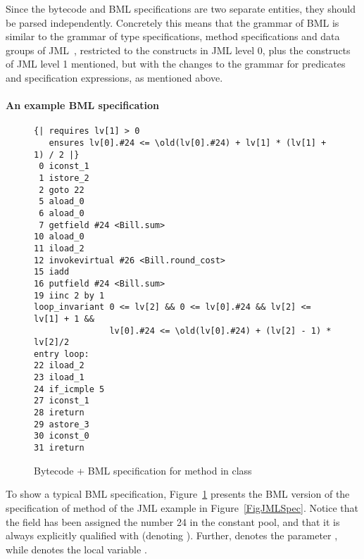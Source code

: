 Since the bytecode and BML specifications are two separate entities,
they should be parsed independently. Concretely this means that the
grammar of BML is similar to the grammar of type specifications,
method specifications and data groups of JML~\cite[\S A.5, A.6,
A.7]{JMLReferenceManual05}, restricted to the constructs in JML level
0, plus the constructs of JML level 1 mentioned, but with the changes
to the grammar for predicates and specification expressions, as
mentioned above. 




\paragraph{An example BML specification}
\label{sec:bml:example}


\begin{figure}[t]
{\small
\begin{verbatim}
{| requires lv[1] > 0 
   ensures lv[0].#24 <= \old(lv[0].#24) + lv[1] * (lv[1] + 1) / 2 |}
 0 iconst_1
 1 istore_2
 2 goto 22 
 5 aload_0
 6 aload_0
 7 getfield #24 <Bill.sum>
10 aload_0
11 iload_2
12 invokevirtual #26 <Bill.round_cost>
15 iadd
16 putfield #24 <Bill.sum>
19 iinc 2 by 1
loop_invariant 0 <= lv[2] && 0 <= lv[0].#24 && lv[2] <= lv[1] + 1 && 
               lv[0].#24 <= \old(lv[0].#24) + (lv[2] - 1) * lv[2]/2
entry loop:
22 iload_2
23 iload_1
24 if_icmple 5 
27 iconst_1
28 ireturn
29 astore_3
30 iconst_0
31 ireturn
\end{verbatim}
}
\caption{Bytecode + BML specification for method  in class }\label{FigBMLSpec}
\end{figure}

To show a typical BML specification, Figure~\ref{FigBMLSpec} presents
the BML version of the specification of method 
of the JML example in Figure~\ref{FigJMLSpec}. Notice that the field
 has been assigned the number 24 in the constant
pool, and that it is always explicitly qualified with 
(denoting ). Further,  denotes the
parameter , while  denotes the local variable
.
 
